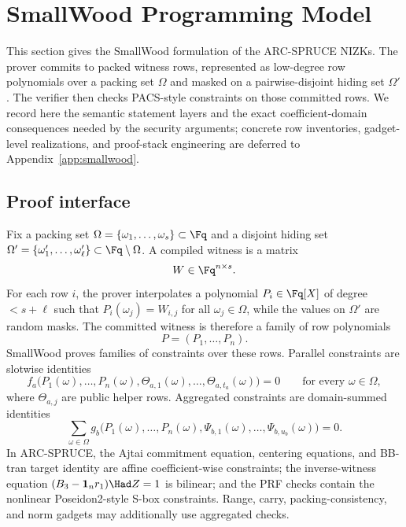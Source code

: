 \section{SmallWood Programming Model}
\label{sec:smallwood-model}
\label{sec:smallwood}

This section gives the SmallWood formulation of the ARC-SPRUCE NIZKs.  The prover commits to packed
witness rows, represented as low-degree row polynomials over a packing set $\Omega$ and masked on a
pairwise-disjoint hiding set $\Omega'$.  The verifier then checks PACS-style constraints on those committed
rows.  We record here the semantic statement layers and the exact coefficient-domain consequences needed by
the security arguments; concrete row inventories, gadget-level realizations, and proof-stack engineering are
deferred to Appendix~\ref{app:smallwood}.

\subsection{Proof interface}
\label{subsec:smallwood-interface}
Fix a packing set $\Omega=\{\omega_1,\ldots,\omega_s\}\subset\Fq$ and a disjoint hiding set
$\Omega'=\{\omega'_1,\ldots,\omega'_\ell\}\subset\Fq\setminus\Omega$.  A compiled witness is a matrix
\[
W\in\Fq^{n\times s}.
\]
For each row $i$, the prover interpolates a polynomial $P_i\in\Fq[X]$ of degree $<s+\ell$ such that
$P_i(\omega_j)=W_{i,j}$ for all $\omega_j\in\Omega$, while the values on $\Omega'$ are random masks.  The
committed witness is therefore a family of row polynomials
\[
P=(P_1,\ldots,P_n).
\]
SmallWood proves families of constraints over these rows.  Parallel constraints are slotwise identities
\[
  f_a\bigl(P_1(\omega),\ldots,P_n(\omega),\Theta_{a,1}(\omega),\ldots,\Theta_{a,t_a}(\omega)\bigr)=0
  \qquad\text{for every }\omega\in\Omega,
\]
where $\Theta_{a,j}$ are public helper rows.  Aggregated constraints are domain-summed identities
\[
  \sum_{\omega\in\Omega}
  g_b\bigl(P_1(\omega),\ldots,P_n(\omega),\Psi_{b,1}(\omega),\ldots,\Psi_{b,u_b}(\omega)\bigr)=0.
\]
In ARC-SPRUCE, the Ajtai commitment equation, centering equations, and BB-tran target identity are affine
coefficient-wise constraints; the inverse-witness equation
\((B_3-\mathbf 1_n r_1)\Had Z=1\) is bilinear; and the PRF checks contain the nonlinear Poseidon2-style
S-box constraints.  Range, carry, packing-consistency, and norm gadgets may additionally use aggregated
checks.

